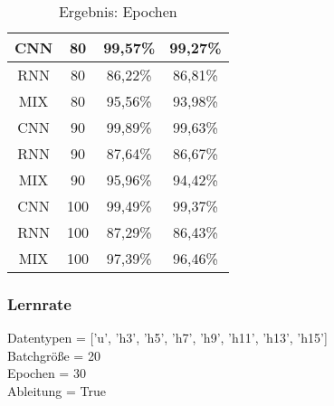 \begin{table}[H]
\begin{tabular}{|c|c|c|c|}
            \hline
            \hline
            CNN & 80 &  99,57\% & 99,27\%  \\ 
            \hline
            RNN & 80 &  86,22\% & 86,81\%  \\ 
            \hline
            MIX & 80 &  95,56\% & 93,98\%  \\ 
            \hline
            \hline
            CNN & 90 &  99,89\% & 99,63\%  \\ 
            \hline
            RNN & 90 &  87,64\% & 86,67\%  \\ 
            \hline
            MIX & 90 &  95,96\% & 94,42\%  \\ 
            \hline
            \hline
            CNN & 100 & 99,49\% & 99,37\%  \\ 
            \hline
            RNN & 100 & 87,29\% & 86,43\%  \\ 
            \hline
            MIX & 100 & 97,39\% & 96,46\% \\
            \hline

        \end{tabular}
        \caption{Ergebnis: Epochen}
        \label{tabl:ErgebnisEpoch}
    \end{table}

    \subsubsection{Lernrate}

    Datentypen = ['u', 'h3', 'h5', 'h7', 'h9', 'h11', 'h13', 'h15']\\
    \noindent
    Batchgröße = 20\\
    \noindent
    Epochen = 30\\
    \noindent
    Ableitung = True\\

